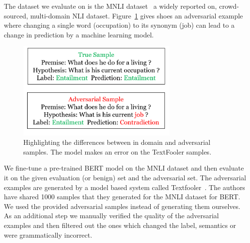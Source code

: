 \documentclass[journal]{vgtc}                %
\begin{document}
The dataset we evaluate on is the MNLI dataset~\cite{williams-etal-2018-broad} a widely reported on, crowd-sourced, multi-domain NLI dataset. Figure~\ref{fig:textfooler} gives shoes an adversarial example where changing a single word (occupation) to its synonym (job) can lead to a change in prediction by a machine learning model.

\begin{figure}[tb]
    \centering
    
    \includegraphics[width=8cm]{figures/textfooler2.png}
    \caption{Highlighting the differences between in domain and adversarial samples. The model makes an error on the TextFooler samples.}
    \label{fig:textfooler}
    
\end{figure}

We fine-tune a pre-trained BERT model on the MNLI dataset and then evaluate it on the given evaluation (or benign) set and the adversarial set. The adversarial examples are generated by a model based system called Textfooler~\cite{jin2019bert}. The authors have shared 1000 samples that they generated for the MNLI dataset for BERT. We used the provided adversarial samples instead of generating them ourselves. As an additional step we manually verified the quality of the adversarial examples and then filtered out the ones which changed the label, semantics or were grammatically incorrect. 


\end{document}
